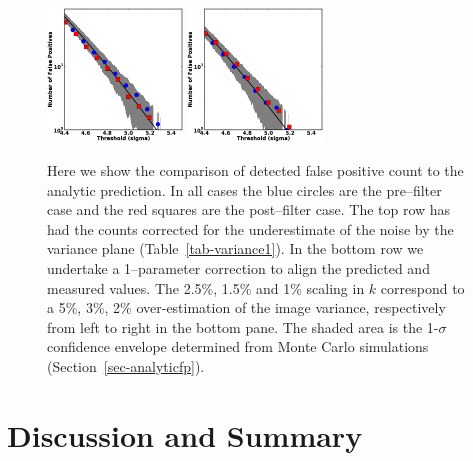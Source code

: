 \documentclass[floatfix, apj]{emulateapj}
\begin{document}
\begin{figure}[!ht]
  \includegraphics[width=0.32\textwidth]{fig4e.eps}
  \includegraphics[width=0.32\textwidth]{fig4f.eps} \\
  \caption{Here we show the comparison of detected false positive
    count to the analytic prediction.
    In all cases the blue circles are the pre--filter case and the red
    squares are the post--filter case.
    The top row has had the counts corrected for the underestimate of
    the noise by the variance plane (Table~\ref{tab-variance1}).
    In the bottom row we undertake a 1--parameter correction to align
    the predicted and measured values.
    The 2.5\%, 1.5\% and 1\% scaling in $k$ correspond to a 5\%, 3\%,
    2\% over-estimation of the image variance, respectively from left
    to right in the bottom pane. 
    The shaded area is the 1-$\sigma$ confidence envelope determined
    from Monte Carlo simulations (Section~\ref{sec-analyticfp}).}
\label{fig:4}
\end{figure}

\section{Discussion and Summary}

\end{document}
